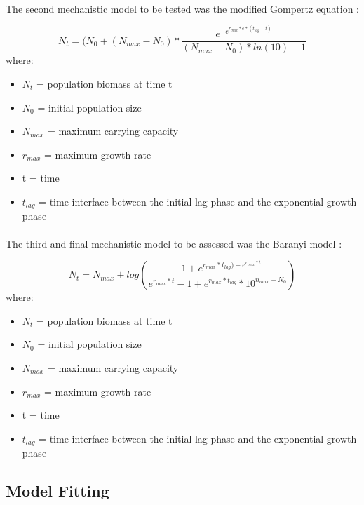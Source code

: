 \documentclass[11pt, a4paper]{article} %
\begin{document}
\paragraph{} The second mechanistic model to be tested was the modified Gompertz equation \citep{RN73}: 

\begin{equation}
N_t = (N_0 + (N_{max} - N_0) * \frac{e^{-e^{r_{max} * e * (t_{lag} - t)}}} {(N_{max} - N_0) * ln(10) + 1}
\label{eqn:Gompertz}
\end{equation}
where:
\begin{itemize}
\item $N_t$ = population biomass at time t
\item $N_0$ = initial population size
\item $N_{max}$ = maximum carrying capacity
\item $r_{max}$ = maximum growth rate 
\item t = time
\item $t_{lag}$ = time interface between the initial lag phase and the exponential growth phase
\end{itemize}

\paragraph{} The third and final mechanistic model to be assessed was the Baranyi model \citep{RN110}:

\begin{equation}
N_t = N_{max} + log(\frac{-1 + e^{r_{max} * t_{lag}) + e^{r_{max} * t}}}{e^{r_{max} * t} - 1 + e^{r_{max} * t_{lag}} * 10^{n_{max} - N_0}})
\label{eqn:Baranyi}
\end{equation}
where:
\begin{itemize}
\item $N_t$ = population biomass at time t
\item $N_0$ = initial population size
\item $N_{max}$ = maximum carrying capacity
\item $r_{max}$ = maximum growth rate
\item t = time
\item $t_{lag}$ = time interface between the initial lag phase and the exponential growth phase
\end{itemize}

\subsection{Model Fitting}
\end{document}

